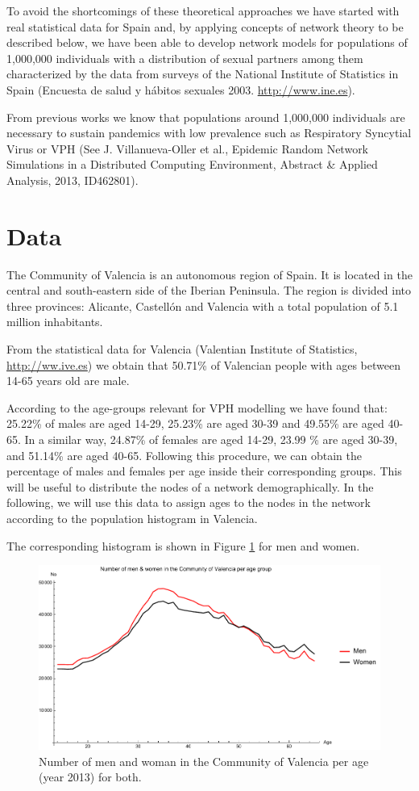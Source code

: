 To avoid the shortcomings of these theoretical approaches we have started with real statistical data for Spain and, by applying concepts of network theory to be described below, we have been able to develop network models for populations of 1,000,000 individuals with a distribution of sexual partners among them characterized by the data from surveys of the National Institute of Statistics in Spain (Encuesta de salud y h\'abitos sexuales 2003. \url{http://www.ine.es}).

From previous works we know that populations around 1,000,000 individuals are necessary to sustain pandemics with low prevalence such as Respiratory Syncytial Virus or VPH (See J. Villanueva-Oller et al., Epidemic Random Network Simulations in a Distributed Computing Environment, Abstract \& Applied Analysis, 2013, ID462801). 

\section{Data}
The Community of Valencia is an autonomous region of Spain. It is located in the central and south-eastern side of the Iberian Peninsula. The region is divided into three provinces: Alicante, Castell\'on and Valencia with a total population of 5.1 million inhabitants.

From the statistical data for Valencia (Valentian Institute of Statistics, \url{http://ww.ive.es}) we obtain that 50.71\% of Valencian people with ages between 14-65 years old are male. 

According to the age-groups relevant for VPH modelling we have found that: 25.22\% of males are aged 14-29, 25.23\% are aged 30-39 and 49.55\% are aged 40-65. In a similar way, 24.87\% of females are aged 14-29, 23.99 \% are aged 30-39, and 51.14\% are aged 40-65. Following this procedure, we can obtain the percentage of males and females per age inside their corresponding groups. This will be useful to distribute the nodes of a network demographically. In the following, we will use this data to assign ages to the nodes in the network according to the population histogram in Valencia.

The corresponding histogram is shown in Figure \ref{demog} for men and women.

\begin{figure}[ht]
	\centering
	\includegraphics[scale=0.7]{demog.pdf}
	\caption{Number of men and woman in the Community of Valencia per age (year 2013) for both.}
	\label{demog}
\end{figure}

